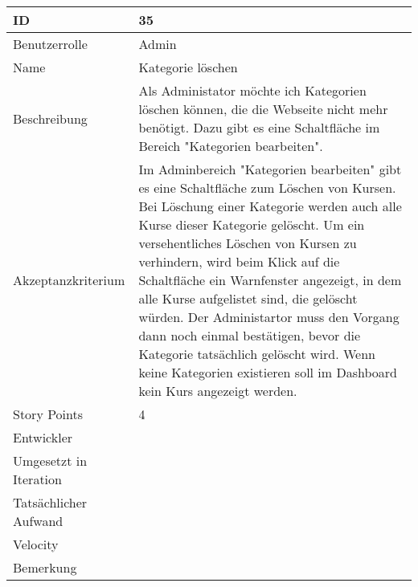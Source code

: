 \begin{tabularx}{\textwidth}{|p{}|X|}
	\hline
	ID & 35\\
	\hline
	Benutzerrolle & Admin\\
	\hline
	Name & Kategorie löschen\\
	\hline
	Beschreibung & Als Administator möchte ich Kategorien löschen können, die die Webseite nicht mehr benötigt. Dazu gibt es eine Schaltfläche im Bereich "Kategorien bearbeiten".\\
	\hline
	Akzeptanzkriterium & Im Adminbereich "Kategorien bearbeiten" gibt es eine Schaltfläche zum Löschen von Kursen. Bei Löschung einer Kategorie werden auch alle Kurse dieser Kategorie gelöscht. Um ein versehentliches Löschen von Kursen zu verhindern, wird beim Klick auf die Schaltfläche ein Warnfenster angezeigt, in dem alle Kurse aufgelistet sind, die gelöscht würden. Der Administartor muss den Vorgang dann noch einmal bestätigen, bevor die Kategorie tatsächlich gelöscht wird.  Wenn keine Kategorien existieren soll im Dashboard kein Kurs angezeigt werden.\\
	\hline
	Story Points & 4 \\
	\hline
	Entwickler & \\
	\hline
	Umgesetzt in Iteration & \\
	\hline
	Tatsächlicher Aufwand & \\
	\hline
	Velocity & \\
	\hline
	Bemerkung & \\
	\hline
\end{tabularx}
\vspace{20pt}
